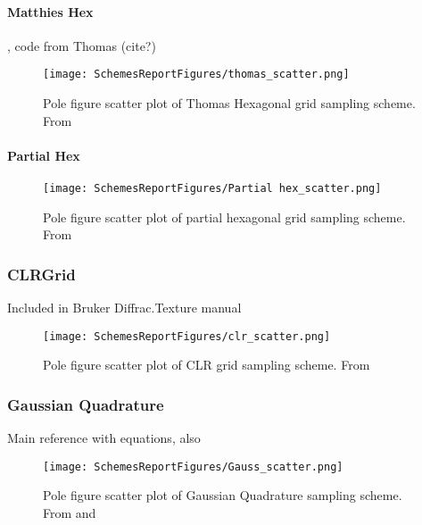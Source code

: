 \documentclass{article}
\begin{document}
\paragraph{Matthies Hex}
\cite{matthies_optimization_1992}, code from Thomas (cite?)

\begin{figure}[ht]
    \centering
    \texttt{[image: SchemesReportFigures/thomas\_scatter.png]}
    \caption{Pole figure scatter plot of Thomas Hexagonal grid sampling scheme. From \cite{matthies_optimization_1992}}
\end{figure}

\paragraph{Partial Hex}

\begin{figure}[ht]
    \centering
    \texttt{[image: SchemesReportFigures/Partial hex\_scatter.png]}
    \caption{Pole figure scatter plot of partial hexagonal grid sampling scheme. From \cite{rizzie_elaboration_2008}}
\end{figure}


\subsubsection{CLRGrid}

Included in Bruker Diffrac.Texture manual \cite{bruker_axs_gmbh_diffractexture_2016}

\begin{figure}[ht]
    \centering
    \texttt{[image: SchemesReportFigures/clr\_scatter.png]}
    \caption{Pole figure scatter plot of CLR grid sampling scheme. From \cite{bruker_axs_gmbh_diffractexture_2016}}
\end{figure}


\subsubsection{Gaussian Quadrature}

\cite{lan_generalized_2015} Main reference with equations, also \cite{lan_private_2017}

\begin{figure}[ht]
    \centering
    \texttt{[image: SchemesReportFigures/Gauss\_scatter.png]}
    \caption{Pole figure scatter plot of Gaussian Quadrature sampling scheme. From \cite{lan_generalized_2015} and \cite{lan_private_2017}}
\end{figure}
\end{document}
